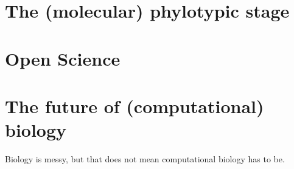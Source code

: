 \section{The (molecular) phylotypic stage}

\section{Open Science}

\section{The future of (computational) biology}

Biology is messy, but that does not mean computational biology has to be.

